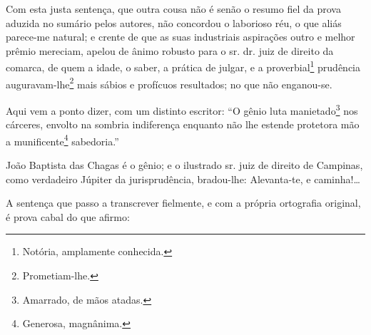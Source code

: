 \asterisc{}

Com esta justa sentença, que outra cousa não é senão o resumo fiel da
prova aduzida no sumário pelos autores, não concordou o laborioso réu, o
que aliás parece-me natural; e crente de que as suas industriais
aspirações outro e melhor prêmio mereciam, apelou de ânimo robusto para
o sr. dr. juiz de direito da comarca, de quem a idade, o saber, a
prática de julgar, e a proverbial\footnote{ Notória, amplamente
  conhecida.} prudência auguravam-lhe\footnote{ Prometiam-lhe.} mais
sábios e profícuos resultados; no que não enganou-se.

Aqui vem a ponto dizer, com um distinto escritor: ``O gênio luta
manietado\footnote{ Amarrado, de mãos atadas.} nos cárceres, envolto na
sombria indiferença enquanto não lhe estende protetora mão a
munificente\footnote{ Generosa, magnânima.} sabedoria.''

João Baptista das Chagas é o gênio; e o ilustrado sr. juiz de direito de
Campinas, como verdadeiro Júpiter da jurisprudência, bradou-lhe:
Alevanta-te, e caminha!\ldots{}

A sentença que passo a transcrever fielmente, e com a própria ortografia
original, é prova cabal do que afirmo:

